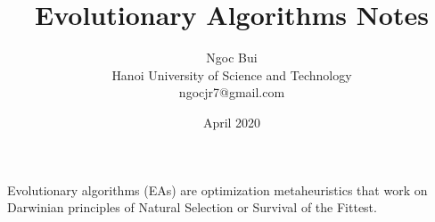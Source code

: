 \documentclass{article}
\title{\textbf{Evolutionary Algorithms Notes}}
\author{Ngoc Bui \\ Hanoi University of Science and Technology\\ {ngocjr7@gmail.com}}
\date{April 2020}
\begin{document}
\maketitle
Evolutionary algorithms (EAs) are optimization metaheuristics that work on Darwinian principles of Natural Selection or Survival of the Fittest.
\begin{markdown}
\end{markdown}




\end{document}
